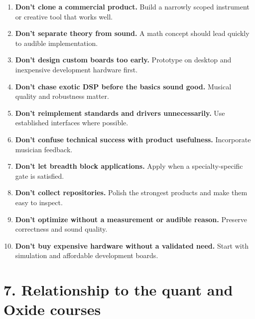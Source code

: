 \documentclass[11pt,letterpaper]{article}
\begin{document}
\begin{enumerate}[leftmargin=*,widest=10]
\item \textbf{Don't clone a commercial product.} Build a narrowly scoped instrument or creative tool that works well.
\item \textbf{Don't separate theory from sound.} A math concept should lead quickly to audible implementation.
\item \textbf{Don't design custom boards too early.} Prototype on desktop and inexpensive development hardware first.
\item \textbf{Don't chase exotic DSP before the basics sound good.} Musical quality and robustness matter.
\item \textbf{Don't reimplement standards and drivers unnecessarily.} Use established interfaces where possible.
\item \textbf{Don't confuse technical success with product usefulness.} Incorporate musician feedback.
\item \textbf{Don't let breadth block applications.} Apply when a specialty-specific gate is satisfied.
\item \textbf{Don't collect repositories.} Polish the strongest products and make them easy to inspect.
\item \textbf{Don't optimize without a measurement or audible reason.} Preserve correctness and sound quality.
\item \textbf{Don't buy expensive hardware without a validated need.} Start with simulation and affordable development boards.
\end{enumerate}

\section{7. Relationship to the quant and Oxide courses}\label{relationship-to-the-quant-and-oxide-courses}
\end{document}
